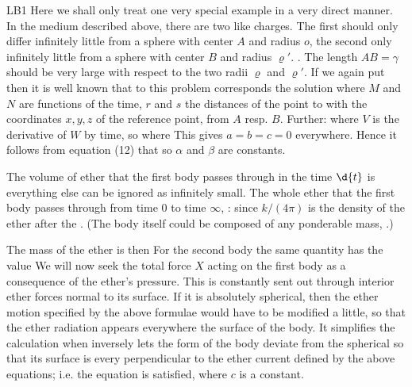 \begin{paper}{LB1}
Here we shall only treat one very special example in a very direct manner. In the medium described above, there are two like charges. The first should only differ infinitely little from a sphere with center $A$ and radius $o$\sic, the second only infinitely little from a sphere with center $B$ and radius $\varrho'$. . The length $AB=\gamma$ should be very large with respect to the two radii $\varrho$ and $\varrho'$. If we again put
then it is well known that to this problem corresponds the solution
where $M$ and $N$ are functions of the time, $r$ and $s$ the distances of the point to with the coordinates $x,y,z$ of the reference point, from $A$ resp. $B$. Further:
where $V$ is the derivative of $W$ by time, so
where
This gives $a=b=c=0$ everywhere. Hence it follows from equation (12) that 
so
$\alpha$ and $\beta$ are constants.

The volume of ether that the first body passes through in the time $\d{t}$ is
everything else can be ignored as infinitely small. The whole ether that the first body passes through from time 0 to time $\infty$, :
since $k/(4\pi)$ is the density of the ether after the . (The body itself could be composed of any ponderable mass, .)

The mass of the ether  is then
For the second body the same quantity has the value
We will now seek the total force $X$ acting on the first body as a consequence of the ether's pressure. This is constantly sent out through interior ether forces normal to its surface. If it is absolutely spherical, then the ether motion specified by the above formulae would have to be modified a little, so that the ether radiation appears everywhere the surface of the body. It simplifies the calculation when inversely lets the form of the body deviate from the spherical so that its surface is every perpendicular to the ether current defined by the above equations; i.e. the equation
is satisfied, where $c$ is a constant.


\end{paper}
